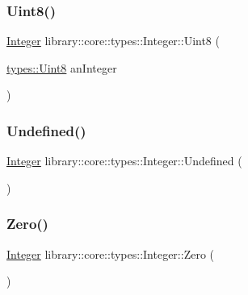 \mbox{\label{classlibrary_1_1core_1_1types_1_1_integer_abf6d5cb5d0100ee859e35181d0287b61}} 
\subsubsection{\texorpdfstring{Uint8()}{Uint8()}}
{\footnotesize\ttfamily \mbox{\hyperlink{classlibrary_1_1core_1_1types_1_1_integer}{Integer}} library\+::core\+::types\+::\+Integer\+::\+Uint8 (\begin{DoxyParamCaption}\item[{\mbox{\hyperlink{namespacelibrary_1_1core_1_1types_a2fb690dd0eb982f92a642dbd0c985662}{types\+::\+Uint8}}}]{an\+Integer }\end{DoxyParamCaption})\hspace{0.3cm}{\ttfamily [static]}}

\mbox{\label{classlibrary_1_1core_1_1types_1_1_integer_a142c2df49031b787daf30673c73fcad7}} 
\subsubsection{\texorpdfstring{Undefined()}{Undefined()}}
{\footnotesize\ttfamily \mbox{\hyperlink{classlibrary_1_1core_1_1types_1_1_integer}{Integer}} library\+::core\+::types\+::\+Integer\+::\+Undefined (\begin{DoxyParamCaption}{ }\end{DoxyParamCaption})\hspace{0.3cm}{\ttfamily [static]}}

\mbox{\label{classlibrary_1_1core_1_1types_1_1_integer_a908c9b717859421a99d6d8c269685211}} 
\subsubsection{\texorpdfstring{Zero()}{Zero()}}
{\footnotesize\ttfamily \mbox{\hyperlink{classlibrary_1_1core_1_1types_1_1_integer}{Integer}} library\+::core\+::types\+::\+Integer\+::\+Zero (\begin{DoxyParamCaption}{ }\end{DoxyParamCaption})\hspace{0.3cm}{\ttfamily [static]}}



